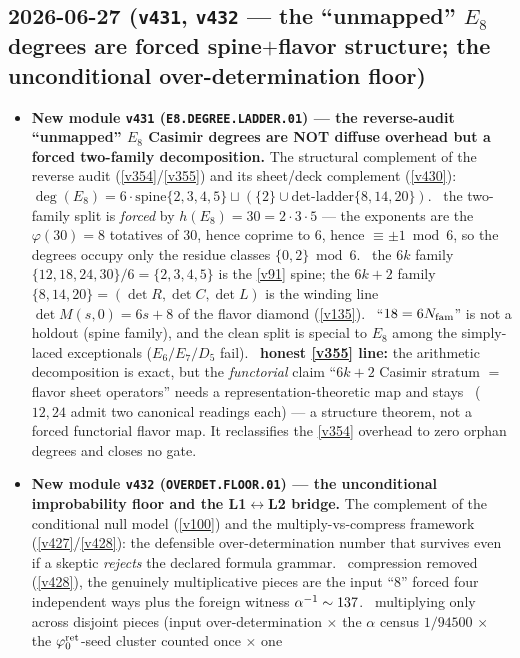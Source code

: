 \subsection*{2026-06-27 (\texttt{v431}, \texttt{v432} --- the ``unmapped'' $E_8$ degrees are forced spine$+$flavor structure; the unconditional over-determination floor)}
\begin{itemize}
\item \textbf{New module \texttt{v431} (\texttt{E8.DEGREE.LADDER.01}) --- the reverse-audit ``unmapped'' $E_8$
Casimir degrees are NOT diffuse overhead but a forced two-family decomposition.} The structural
complement of the reverse audit (\vref{v354}/\vref{v355}) and its sheet/deck complement (\vref{v430}):
$\deg(E_8)=6\cdot\mathrm{spine}\{2,3,4,5\}\sqcup(\{2\}\cup\mathrm{det\text{-}ladder}\{8,14,20\})$.
\mE\ the two-family split is \emph{forced} by $h(E_8)=30=2\cdot3\cdot5$ --- the exponents are the
$\varphi(30)=8$ totatives of $30$, hence coprime to $6$, hence $\equiv\pm1\bmod6$, so the degrees occupy
only the residue classes $\{0,2\}\bmod6$. \mE\ the $6k$ family $\{12,18,24,30\}/6=\{2,3,4,5\}$ is the
\vref{v91} spine; the $6k{+}2$ family $\{8,14,20\}=(\det R,\det C,\det L)$ is the winding line
$\det M(s,0)=6s+8$ of the flavor diamond (\vref{v135}). \mE\ ``$18=6N_{\mathrm{fam}}$'' is not a holdout (spine
family), and the clean split is special to $E_8$ among the simply-laced exceptionals ($E_6/E_7/D_5$ fail).
\mC\ \textbf{honest \vref{v355} line:} the arithmetic decomposition is exact, but the \emph{functorial}
claim ``$6k{+}2$ Casimir stratum $=$ flavor sheet operators'' needs a representation-theoretic map and
stays \mC\ ($12,24$ admit two canonical readings each) --- a structure theorem, not a forced functorial
flavor map. It reclassifies the \vref{v354} overhead to zero orphan degrees and closes no gate.
\item \textbf{New module \texttt{v432} (\texttt{OVERDET.FLOOR.01}) --- the unconditional improbability
floor and the L1$\leftrightarrow$L2 bridge.} The complement of the conditional null model (\vref{v100})
and the multiply-vs-compress framework (\vref{v427}/\vref{v428}): the defensible over-determination number
that survives even if a skeptic \emph{rejects} the declared formula grammar. \mE\ compression removed
(\vref{v428}), the genuinely multiplicative pieces are the input ``$8$'' forced four independent ways plus
the foreign witness $\alpha^{-1}\sim137$. \mC\ multiplying only across disjoint pieces (input over-determination
$\times$ the $\alpha$ census $1/94500$ $\times$ the $\varphi_0^{\mathrm{ret}}$-seed cluster counted once $\times$ one

\end{itemize}
